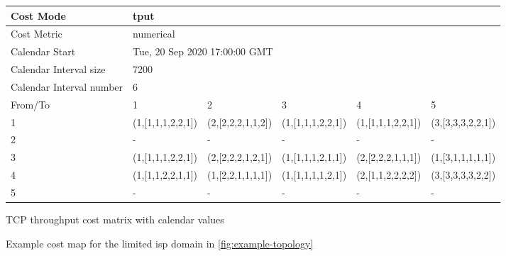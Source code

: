 \begin{figure}
\begin{subtable}{1\linewidth}
        \footnotesize
        \centering
        \hspace*{-2em}
        \begin{tabular}{|l|l|l|l|l|l|}
        \hline
        Cost Mode                & \multicolumn{5}{|l|}{tput}                            \\ \hline
        Cost Metric              & \multicolumn{5}{|l|}{numerical}                       \\ \hline
        Calendar Start           & \multicolumn{5}{|l|}{Tue, 20 Sep 2020 17:00:00 GMT}   \\ \hline
        Calendar Interval size   & \multicolumn{5}{|l|}{7200}                            \\ \hline
        Calendar Interval number & \multicolumn{5}{|l|}{6}                               \\ \hline
        From/To                  & 1                    & 2                     & 3                        & 4                   & 5                  \\ \hline
        1                        & (1,[1,1,1,2,2,1])    & (2,[2,2,2,1,1,2])     & (1,[1,1,1,2,2,1])        & (1,[1,1,1,2,2,1])   & (3,[3,3,3,2,2,1])  \\ \hline
        2                        & -                    & -                     & -                        & -                   & -                  \\ \hline
        3                        & (1,[1,1,1,2,2,1])    & (2,[2,2,2,1,2,1])     & (1,[1,1,1,2,1,1])        & (2,[2,2,2,1,1,1])   & (1,[3,1,1,1,1,1])  \\ \hline
        4                        & (1,[1,1,2,2,1,1])    & (1,[2,2,1,1,1,1])     & (1,[1,1,1,1,2,1])        & (2,[1,1,2,2,2,2])   & (3,[3,3,3,3,2,2])  \\ \hline
        5                        & -                    & -                     & -                        & -                   & -                  \\ \hline
        \end{tabular}
    \caption{TCP throughput cost matrix with calendar values}
    \end{subtable}

    \caption{Example cost map for the limited \gls{isp} domain in \ref{fig:example-topology}}
    \label{table:costmap-example-boundary}
\end{figure}

    \newpage

